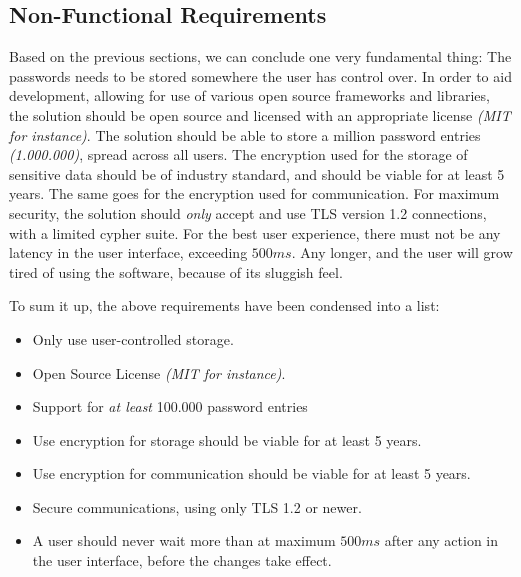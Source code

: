 		\subsection*{Non-Functional Requirements}
			Based on the previous sections, we can conclude one very fundamental thing: The passwords needs to be stored somewhere the user has control over. In order to aid development, allowing for use of various open source frameworks and libraries, the solution should be open source and licensed with an appropriate license \emph{(MIT for instance)}. The solution should be able to store a million password entries \emph{(1.000.000)}, spread across all users. The encryption used for the storage of sensitive data should be of industry standard, and should be viable for at least 5 years. The same goes for the encryption used for communication. For maximum security, the solution should \emph{only} accept and use TLS version 1.2 connections, with a limited cypher suite. For the best user experience, there must not be any latency in the user interface, exceeding $500ms$. Any longer, and the user will grow tired of using the software, because of its sluggish feel.

			To sum it up, the above requirements have been condensed into a list:
			\begin{itemize}
				\item Only use user-controlled storage.
				\item Open Source License \emph{(MIT for instance)}.
				\item Support for \emph{at least} 100.000 password entries
				\item Use encryption for storage should be viable for at least 5 years.
				\item Use encryption for communication should be viable for at least 5 years.
				\item Secure communications, using only TLS 1.2 or newer.
				\item A user should never wait more than at maximum $500ms$ after any action in the user interface, before the changes take effect.
			\end{itemize}